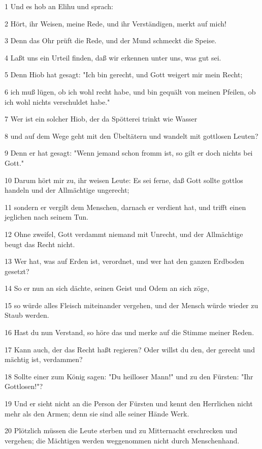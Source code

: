 \par 1 Und es hob an Elihu und sprach:
\par 2 Hört, ihr Weisen, meine Rede, und ihr Verständigen, merkt auf mich!
\par 3 Denn das Ohr prüft die Rede, und der Mund schmeckt die Speise.
\par 4 Laßt uns ein Urteil finden, daß wir erkennen unter uns, was gut sei.
\par 5 Denn Hiob hat gesagt: "Ich bin gerecht, und Gott weigert mir mein Recht;
\par 6 ich muß lügen, ob ich wohl recht habe, und bin gequält von meinen Pfeilen, ob ich wohl nichts verschuldet habe."
\par 7 Wer ist ein solcher Hiob, der da Spötterei trinkt wie Wasser
\par 8 und auf dem Wege geht mit den Übeltätern und wandelt mit gottlosen Leuten?
\par 9 Denn er hat gesagt: "Wenn jemand schon fromm ist, so gilt er doch nichts bei Gott."
\par 10 Darum hört mir zu, ihr weisen Leute: Es sei ferne, daß Gott sollte gottlos handeln und der Allmächtige ungerecht;
\par 11 sondern er vergilt dem Menschen, darnach er verdient hat, und trifft einen jeglichen nach seinem Tun.
\par 12 Ohne zweifel, Gott verdammt niemand mit Unrecht, und der Allmächtige beugt das Recht nicht.
\par 13 Wer hat, was auf Erden ist, verordnet, und wer hat den ganzen Erdboden gesetzt?
\par 14 So er nun an sich dächte, seinen Geist und Odem an sich zöge,
\par 15 so würde alles Fleisch miteinander vergehen, und der Mensch würde wieder zu Staub werden.
\par 16 Hast du nun Verstand, so höre das und merke auf die Stimme meiner Reden.
\par 17 Kann auch, der das Recht haßt regieren? Oder willst du den, der gerecht und mächtig ist, verdammen?
\par 18 Sollte einer zum König sagen: "Du heilloser Mann!" und zu den Fürsten: "Ihr Gottlosen!"?
\par 19 Und er sieht nicht an die Person der Fürsten und kennt den Herrlichen nicht mehr als den Armen; denn sie sind alle seiner Hände Werk.
\par 20 Plötzlich müssen die Leute sterben und zu Mitternacht erschrecken und vergehen; die Mächtigen werden weggenommen nicht durch Menschenhand.
